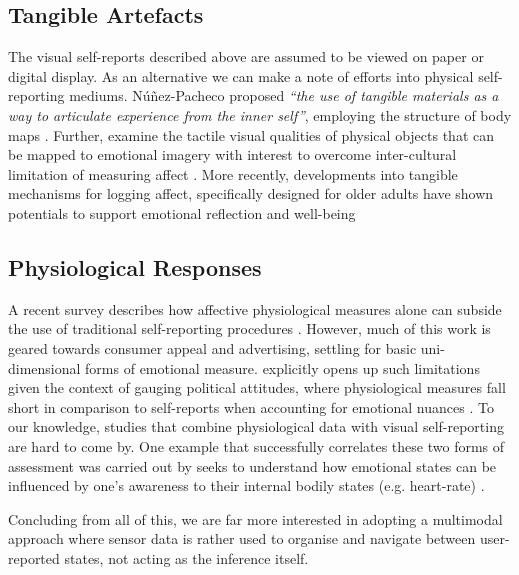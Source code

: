 \subsection{Tangible Artefacts}

The visual self-reports described above are assumed to be viewed on paper or digital display. As an alternative we can make a note of efforts into physical self-reporting mediums. Núñez-Pacheco proposed \textit{“the use of tangible materials as a way to articulate experience from the inner self”}, employing the structure of body maps \cite{nunez-pacheco_tangible_2021}. Further, \citeauthor{isbister_sensual_2007} examine the tactile visual qualities of physical objects that can be mapped to emotional imagery with interest to overcome inter-cultural limitation of measuring affect \cite{isbister_sensual_2007}. More recently, developments into tangible mechanisms for logging affect, specifically designed for older adults have shown potentials to support emotional reflection and well-being \cite{gooch_designing_2022}

\subsection{Physiological Responses}
A recent survey describes how affective physiological measures alone can subside the use of traditional self-reporting procedures \cite{barker_self-report_2016}. However, much of this work is geared towards consumer appeal and advertising, settling for basic uni-dimensional forms of emotional measure. \citeauthor{ciuk_measuring_2015} explicitly opens up such limitations given the context of gauging political attitudes, where physiological measures fall short in comparison to self-reports when accounting for emotional nuances \cite{ciuk_measuring_2015}. To our knowledge, studies that combine physiological data with visual self-reporting are hard to come by. One example that successfully correlates these two forms of assessment was carried out by \citeauthor{jung_role_2017} seeks to understand how emotional states can be influenced by one's awareness to their internal bodily states (e.g. heart-rate) \cite{jung_role_2017}.

Concluding from all of this, we are far more interested in adopting a multimodal approach where sensor data is rather used to organise and navigate between user-reported states, not acting as the inference itself.


